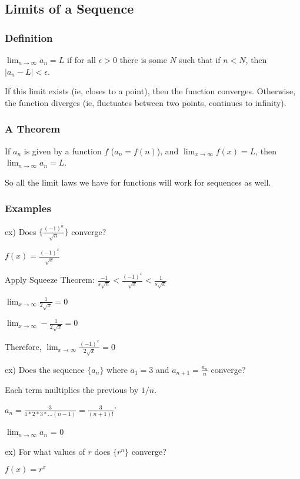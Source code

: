 \documentclass{article}
\begin{document}
\subsection{Limits of a Sequence}

\subsubsection{Definition}

$\lim_{n\to\infty} a_n = L$ if for all $\epsilon > 0$ there is some $N$ such that if $n<N$, then $|a_n-L|<\epsilon$. 

If this limit exists (ie, closes to a point), then the function converges. Otherwise, the function diverges (ie, fluctuates between two points, continues to infinity).

\subsubsection{A Theorem}

If $a_n$ is given by a function $f$ ($a_n=f(n)$), and $\lim_{x \to \infty} f(x)=L$, then $\lim_{n\to\infty}a_n=L$.

So all the limit laws we have for functions will work for sequences as well. 

\subsubsection{Examples}

ex) Does $\{\frac{(-1)^n}{\sqrt{n}}\}$ converge?

$f(x) = \frac{(-1)^x}{\sqrt{x}}$

Apply Squeeze Theorem:
$\frac{-1}{s\sqrt{n}}<\frac{(-1)^x}{\sqrt{x}} < \frac{1}{s\sqrt{x}}$

$\lim_{x\to\infty} \frac{1}{2\sqrt{x}} = 0$

$\lim_{x\to\infty} -\frac{1}{2\sqrt{x}} = 0$

Therefore, $\lim_{x\to\infty}\frac{(-1)^x}{2\sqrt{x}} = 0$

ex) Does the sequence $\{a_n\}$ where $a_1=3$ and $a_{n+1}=\frac{a_n}{n}$ converge?

Each term multiplies the previous by $1/n$.

$a_n = \frac{3}{1*2*3*...(n-1)} = \frac{3}{(n+1)!}$'

$\lim_{n\to\infty}a_n$ = 0

ex) For what values of $r$ does $\{r^n\}$ converge?

$f(x) = r^x$
\end{document}
